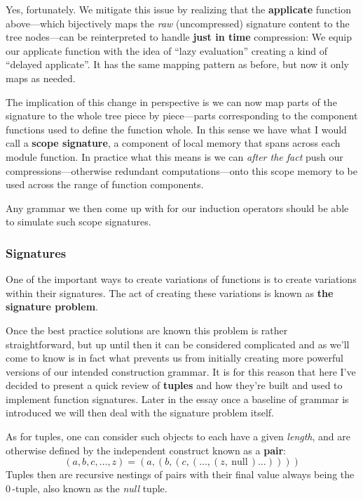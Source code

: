 \documentclass[twoside]{article}
\newcommand{\strong}[1]{{\bfseries #1}}
\begin{document}
Yes, fortunately. We mitigate this issue by realizing that the \strong{applicate} function above---which bijectively maps
the \emph{raw} (uncompressed) signature content to the tree nodes---can be reinterpreted to handle \strong{just in time}
compression: We equip our applicate function with the idea of ``lazy evaluation'' creating a kind of ``delayed applicate''.
It has the same mapping pattern as before, but now it only maps as needed.

The implication of this change in perspective is we can now map parts of the signature to the whole tree piece by
piece---parts corresponding to the component functions used to define the function whole. In this sense we have what
I would call a \strong{scope signature}, a component of local memory that spans across each module function. In practice
what this means is we can \emph{after the fact} push our compressions---otherwise redundant computations---onto this scope
memory to be used across the range of function components.

Any grammar we then come up with for our induction operators should be able to simulate such scope signatures.

\subsubsection*{Signatures}

One of the important ways to create variations of functions is to create variations within their signatures.
The act of creating these variations is known as \strong{the signature problem}.

Once the best practice solutions are known this problem is rather straightforward, but up until then it can be considered
complicated and as we'll come to know is in fact what prevents us from initially creating more powerful versions of our
intended construction grammar. It is for this reason that here I've decided to present a quick review of \strong{tuples}
and how they're built and used to implement function signatures. Later in the essay once a baseline of grammar is introduced
we will then deal with the signature problem itself.

As for tuples, one can consider such objects to each have a given \emph{length},
and are otherwise defined by the independent construct known as a \strong{pair}:
$$ (a, b, c, \ldots, z) = (a, (b, (c, (\ldots, (z,\ \mbox{null}\,) \ldots )))) $$
Tuples then are recursive nestings of pairs with their final value always being the $ 0\, $-tuple,
also known as the \emph{null} tuple.
\end{document}
